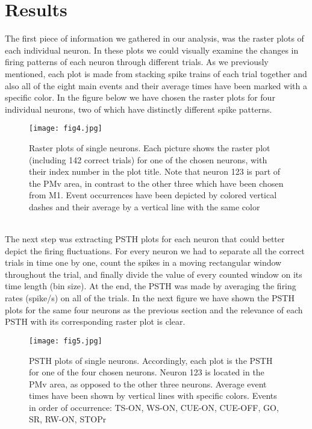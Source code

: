 \documentclass[9pt,twocolumn]{paper-template}
\begin{document}
\section*{Results}
The first piece of information we gathered in our analysis, was the raster plots of each individual neuron. In these plots we could visually examine the changes in firing patterns of each neuron through different trials. As we previously mentioned, each plot is made from stacking spike trains of each trial together and also all of the eight main events and their average times have been marked with a specific color. In the figure below we have chosen the raster plots for four individual neurons, two of which have distinctly different spike patterns.\\
\begin{SCfigure*}[\sidecaptionrelwidth][t]
\centering
\texttt{[image: fig4.jpg]}
\caption{Raster plots of single neurons. Each picture shows the raster plot (including 142 correct trials) for one of the chosen neurons, with their index number in the plot title. Note that neuron 123 is part of the PMv area, in contrast to the other three which have been chosen from M1. Event occurrences have been depicted by colored vertical dashes and their average by a vertical line with the same color}\label{fig:side}
\end{SCfigure*}
\\
The next step was extracting PSTH plots for each neuron that could better depict the firing fluctuations. For every neuron we had to separate all the correct trials in time one by one, count the spikes in a moving rectangular window throughout the trial, and finally divide the value of every counted window on its time length (bin size). At the end, the PSTH was made by averaging the firing rates (spike/s) on all of the trials. In the next figure we have shown the PSTH plots for the same four neurons as the previous section and the relevance of each PSTH with its corresponding raster plot is clear.
\\
\begin{SCfigure*}[\sidecaptionrelwidth][t]
\centering
\texttt{[image: fig5.jpg]}
\caption{PSTH plots of single neurons. Accordingly, each plot is the PSTH for one of the four chosen neurons. Neuron 123 is located in the PMv area, as opposed to the other three neurons. Average event times have been shown by vertical lines with specific colors. Events in order of occurrence: TS-ON, WS-ON, CUE-ON, CUE-OFF, GO, SR, RW-ON, STOPr}\label{fig:side}
\end{SCfigure*}
\end{document}
